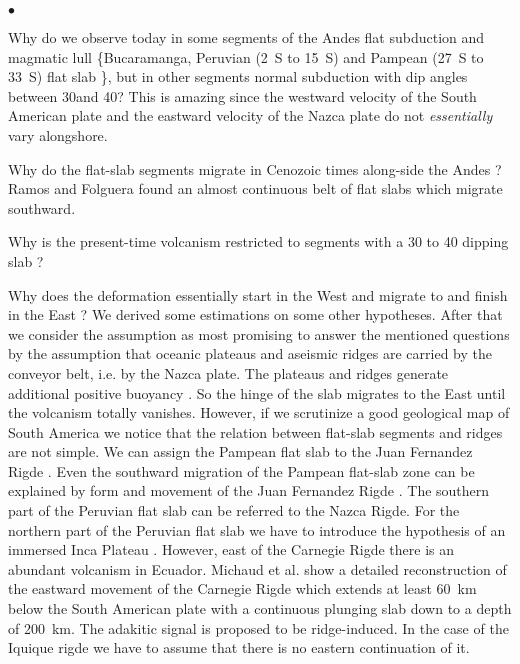 \documentclass[twoside,10pt]{article}
\newenvironment{dlist}
   {\begin{list}
      {$\bullet$}
      {
      \setlength{\topsep}{0.5ex}
      \setlength{\partopsep}{0.0ex}
      \setlength{\parsep}{0.5ex}
      \setlength{\itemsep}{0.0ex}
      \setlength{\itemindent}{3.0ex}
      \setlength{\leftmargin}{0.0ex}
      \setlength{\labelsep}{1.0ex}
      }
   }
   {\end{list}}
\begin{document}
\begin{dlist}
 \item Why do we observe today in some segments of the Andes flat subduction and magmatic lull \{Bucaramanga, Peruvian (2\textdegree~S to 15\textdegree~S) and Pampean (27\textdegree~S to 33\textdegree~S) flat slab \cite{Ramos2002}\}, but in other segments normal subduction with dip angles between 30\textdegree and 40\textdegree ?
This is amazing since the westward velocity of the South American plate and the eastward velocity of the Nazca plate do not \emph{essentially} vary alongshore.
 \item Why do the flat-slab segments migrate in Cenozoic times along-side the Andes \cite{Ramos2009}?
Ramos and Folguera \cite{Ramos2009a} found an almost continuous belt of flat slabs which migrate southward.
 \item Why is the present-time volcanism restricted to segments with a 30\textdegree{} to 40\textdegree{} dipping slab \cite{Sebrier1991,Kay1996,Allmendinger1997,Kley2007}?
 \item Why does the deformation essentially start in the West and migrate to and finish in the East \cite{Oncken2006}?
We derived some estimations on some other hypotheses. 
After that we consider the assumption as most promising to answer the mentioned questions by the assumption that oceanic plateaus and aseismic ridges are carried by the conveyor belt, i.e. by the Nazca plate.
The plateaus and ridges generate additional positive buoyancy \cite{Gutscher2002}. 
So the hinge of the slab migrates to the East until the volcanism totally vanishes.
However, if we scrutinize a good geological map of South America we notice that the relation between flat-slab segments and ridges are not simple.
We can assign the Pampean flat slab to the Juan Fernandez Rigde \cite{Alvarado2009}.
Even the southward migration of the Pampean flat-slab zone can be explained by form and movement of the Juan Fernandez Rigde \cite{Kay2009}.
The southern part of the Peruvian flat slab can be referred to the Nazca Rigde. 
For the northern part of the Peruvian flat slab we have to introduce the hypothesis of an immersed Inca Plateau \cite{Gutscher2000}.
However, east of the Carnegie Rigde there is an abundant volcanism in Ecuador.
Michaud et al. \cite{Michaud2009} show a detailed reconstruction of the eastward movement of the Carnegie Rigde which extends at least 60~km below the South American plate with a continuous plunging slab down to a depth of 200~km.
The adakitic signal is proposed to be ridge-induced.
In the case of the Iquique rigde we have to assume that there is no eastern continuation of it. 

\end{dlist}
\end{document}
